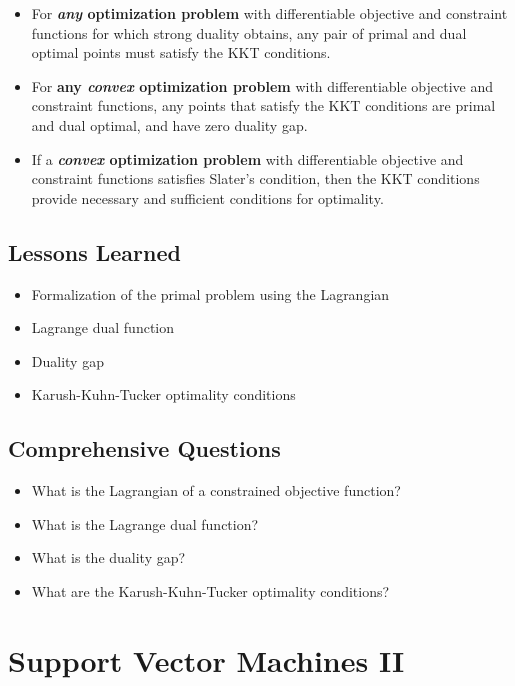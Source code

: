   \begin{itemize}
    \item For \textbf{\emph{any} optimization problem} with differentiable objective and constraint functions for which strong duality obtains, any pair of primal and dual optimal points must satisfy the KKT conditions.  
    \item For \textbf{any \emph{convex} optimization problem} with differentiable objective and constraint functions, any points that satisfy the KKT conditions are primal and dual optimal, and have zero duality gap.  
    \item If a \textbf{\emph{convex} optimization problem} with differentiable objective and constraint functions satisfies Slater's condition, then the KKT conditions provide necessary and sufficient conditions for optimality.
  \end{itemize}

\subsection{Lessons Learned}
 
  \begin{itemize}
    \item Formalization of the primal problem using the Lagrangian 
    \item Lagrange dual function 
    \item Duality gap 
    \item Karush-Kuhn-Tucker optimality conditions
  \end{itemize}

\subsection{Comprehensive Questions}

  \begin{itemize}
    \item What is the Lagrangian of a constrained objective function? 
    \item What is the Lagrange dual function?
    \item What is the duality gap? 
    \item What are the Karush-Kuhn-Tucker optimality conditions?
  \end{itemize}
   
\newpage
\section{Support Vector Machines II}\autocite{hastie2009,bishop2006,schoelkopf2002}

